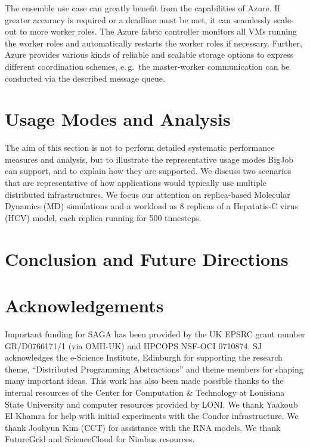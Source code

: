 \documentclass[conference,final]{IEEEtran}
\newcommand{\up}{\vspace*{-1em}}
\newcommand{\numrep}{8 }
\def\acknowledgementname{Acknowledgements}
\newenvironment{acknowledgement}%
{\section*{\acknowledgementname}%
\parindent=0pt%
}
\newcommand{\alnote}[1]{ {\textcolor{blue} { ***AL: #1 }}}
\newcommand{\alnote}[1]{}
\begin{document}

The ensemble use case can greatly benefit from the
capabilities of Azure. If greater accuracy is required or a deadline
must be met, it can seamlessly scale-out to more worker roles.  The
Azure fabric controller monitors all VMs running the worker roles and
automatically restarts the worker roles if necessary. Further, Azure
provides various kinds of reliable and scalable storage options to
express different coordination schemes, e.\,g.\ the master-worker
communication can be conducted via the described message queue.


\section{Usage Modes and Analysis}

The aim of this section is not to perform detailed systematic
performance measures and analysis, but to illustrate the
representative usage modes BigJob can support, and to explain how they
are supported.  We discuss two scenarios that are representative of
how applications would typically use multiple distributed
infrastructures. We focus our attention on replica-based Molecular Dynamics (MD)
simulations and a workload as \numrep replicas of a Hepatatis-C virus
(HCV) model, each replica running for 500 timesteps.  


\section{Conclusion and Future Directions}



\begin{acknowledgement} 
  \up \footnotesize{Important funding for SAGA has been provided by
    the UK EPSRC grant number GR/D0766171/1 (via OMII-UK) and HPCOPS
    NSF-OCI 0710874. SJ acknowledges the e-Science Institute,
    Edinburgh for supporting the research theme, ``Distributed
    Programming Abstractions'' and theme members for shaping many
    important ideas. This work has also been made possible thanks to
    the internal resources of the Center for Computation \& Technology
    at Louisiana State University and computer resources provided by
    LONI. We thank Yaakoub El Khamra for help with initial experiments
    with the Condor infrastructure. We thank Joohyun Kim (CCT) for
    assistance with the RNA models. We thank FutureGrid and
    ScienceCloud for Nimbus resources.}
\end{acknowledgement}

\up


\end{document}
